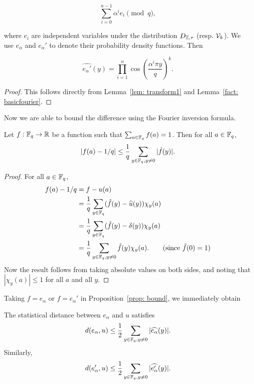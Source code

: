 \documentclass{amsart}
\begin{document}
$$ \sum_{i=0}^{n-1} \alpha^i e_i \pmod {q},$$

where $e_i$ are independent variables under the distribution $D_{\mathbb{Z},\tau}$ (resp. $\mathcal{V}_k$). We use $e_\alpha$ and $e_\alpha'$ to denote their probability density functions. Then

\begin{Lemma}
\label{lem: transform2}
\[
    \widehat{e_\alpha'}(y) = \prod_{i=1}^{n} \cos \left(\frac{ \alpha^i \pi y}{q} \right)^k.
\]
\end{Lemma}

\begin{proof}
This follows directly from Lemma~\ref{lem: transform1} and Lemma~\ref{fact: basicfourier}.
\end{proof}

Now we are able to bound the difference  using the Fourier inversion formula.

\begin{Prop} \label{prop: bound}
Let $f: \mathbb{F}_q \to \mathbb{R}$ be a function such that $\sum_{a \in \mathbb{F}_q} f(a) = 1$. Then for all $a \in \mathbb{F}_q$,
\begin{equation} \label{eq: secure}
    |f(a) -  1/q| \leq \frac{1}{q}  \sum_{y \in \mathbb{F}_q, y \neq 0}  |\hat{f}(y)|.
\end{equation}
\end{Prop}

\begin{proof} For all $a \in \mathbb{F}_q$,
\begin{align*}
    f(a) - 1/q &= f - u(a) \\
    & = \frac{1}{q} \sum_{y \in \mathbb{F}_q} (\hat{f}(y) - \widehat{u}(y) )\chi_y(a) \\
& = \frac{1}{q} \sum_{y \in \mathbb{F}_q} (\hat{f}(y)  - \delta(y) )\chi_y(a) \\
& = \frac{1}{q} \sum_{y \in \mathbb{F}_q, y \neq 0} \hat{f}(y)  \chi_y(a).  \qquad \mbox{(since $\hat{f}(0) = 1$)}
\end{align*}
Now the result follows from taking absolute values on both sides, and noting that $|\chi_y(a)| \leq 1$ for all $a$ and all $y$.
\end{proof}

Taking $f = e_\alpha$ or $f = e_\alpha'$ in Proposition~\ref{prop: bound}, we immediately obtain
\begin{theorem} \label{cor: stat dist}
The statistical distance between $e_\alpha$ and $u$ satisfies $$d(e_\alpha,u) \leq \frac{1}{2}  \sum_{y \in \mathbb{F}_q, y \neq 0}  |\widehat{e_\alpha}(y)|.$$
Similarly,
\begin{equation} \label{distance}
d(e_\alpha',u) \leq \frac{1}{2}  \sum_{y \in \mathbb{F}_q, y \neq 0}  |\widehat{e'_\alpha}(y)|.
\end{equation}
\end{theorem}
\end{document}
